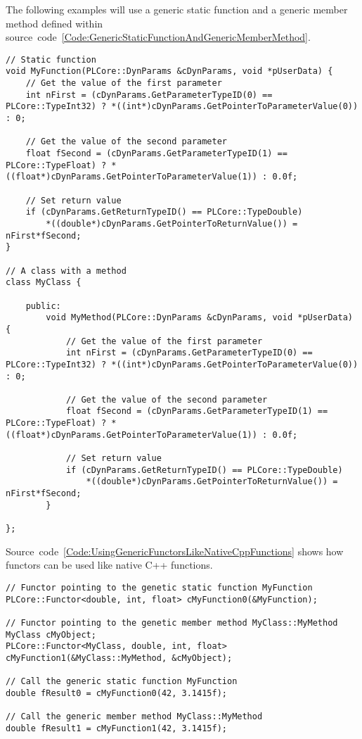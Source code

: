 The following examples will use a generic static function and a generic member method defined within source~code~\ref{Code:GenericStaticFunctionAndGenericMemberMethod}.
\begin{lstlisting}[label=Code:GenericStaticFunctionAndGenericMemberMethod,caption={Static generic function and generic member method}]
// Static function
void MyFunction(PLCore::DynParams &cDynParams, void *pUserData) {
	// Get the value of the first parameter
	int nFirst = (cDynParams.GetParameterTypeID(0) == PLCore::TypeInt32) ? *((int*)cDynParams.GetPointerToParameterValue(0)) : 0;

	// Get the value of the second parameter
	float fSecond = (cDynParams.GetParameterTypeID(1) == PLCore::TypeFloat) ? *((float*)cDynParams.GetPointerToParameterValue(1)) : 0.0f;

	// Set return value
	if (cDynParams.GetReturnTypeID() == PLCore::TypeDouble)
		*((double*)cDynParams.GetPointerToReturnValue()) = nFirst*fSecond;
}

// A class with a method
class MyClass {

	public:
		void MyMethod(PLCore::DynParams &cDynParams, void *pUserData) {
			// Get the value of the first parameter
			int nFirst = (cDynParams.GetParameterTypeID(0) == PLCore::TypeInt32) ? *((int*)cDynParams.GetPointerToParameterValue(0)) : 0;

			// Get the value of the second parameter
			float fSecond = (cDynParams.GetParameterTypeID(1) == PLCore::TypeFloat) ? *((float*)cDynParams.GetPointerToParameterValue(1)) : 0.0f;

			// Set return value
			if (cDynParams.GetReturnTypeID() == PLCore::TypeDouble)
				*((double*)cDynParams.GetPointerToReturnValue()) = nFirst*fSecond;
		}

};
\end{lstlisting}
Source~code~\ref{Code:UsingGenericFunctorsLikeNativeCppFunctions} shows how functors can be used like native C++ functions.
\begin{lstlisting}[float=htb,label=Code:UsingGenericFunctorsLikeNativeCppFunctions,caption={Using functors like native C++ functions}]
// Functor pointing to the genetic static function MyFunction
PLCore::Functor<double, int, float> cMyFunction0(&MyFunction);

// Functor pointing to the genetic member method MyClass::MyMethod
MyClass cMyObject;
PLCore::Functor<MyClass, double, int, float> cMyFunction1(&MyClass::MyMethod, &cMyObject);

// Call the generic static function MyFunction
double fResult0 = cMyFunction0(42, 3.1415f);

// Call the generic member method MyClass::MyMethod
double fResult1 = cMyFunction1(42, 3.1415f);
\end{lstlisting}


